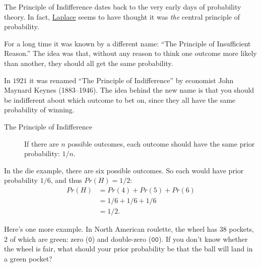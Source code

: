 \documentclass[justified]{tufte-book}
\newcommand{\pr}{Pr}
\theoremstyle{definition}
\theoremstyle{definition}
\theoremstyle{definition}
\theoremstyle{definition}
\theoremstyle{remark}
\begin{document}
\begin{marginfigure}
The Principle of Indifference dates back to the very early days of
probability theory. In fact, \protect\hyperlink{fig:laplace}{Laplace}
seems to have thought it was \emph{the} central principle of
probability.

For a long time it was known by a different name: ``The Principle of
Insufficient Reason.'' The idea was that, without any reason to think
one outcome more likely than another, they should all get the same
probability.

In \(1921\) it was renamed ``The Principle of Indifference'' by
economist John Maynard Keynes (1883--1946). The idea behind the new name
is that you should be indifferent about which outcome to bet on, since
they all have the same probability of winning.
\end{marginfigure}

\begin{description}
\item[The Principle of Indifference]
If there are \(n\) possible outcomes, each outcome should have the same prior probability: \(1/n\).
\end{description}

In the die example, there are six possible outcomes. So each would have prior probability \(1/6\), and thus \(\pr(H) = 1/2\):
\[
  \begin{aligned}
    \pr(H) &= \pr(4) + \pr(5) + \pr(6)\\
          &= 1/6 + 1/6 + 1/6\\
          &= 1/2.
  \end{aligned}
\]

Here's one more example. In North American roulette, the wheel has \(38\) pockets, \(2\) of which are green: zero (\(\mathtt{0}\)) and double-zero (\(\mathtt{00}\)). If you don't know whether the wheel is fair, what should your prior probability be that the ball will land in a green pocket?
\end{document}
